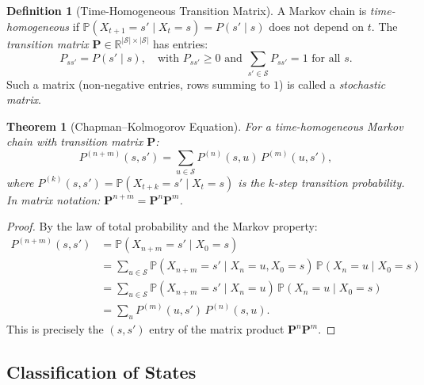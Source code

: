 \documentclass[11pt,a4paper]{article}
\theoremstyle{definition}
\newtheorem{definition}{Definition}[section]
\theoremstyle{plain}
\newtheorem{theorem}{Theorem}[section]
\theoremstyle{remark}
\newcommand{\R}{\mathbb{R}}
\newcommand{\Prob}{\mathbb{P}}
\begin{document}
\begin{definition}[Time-Homogeneous Transition Matrix]
\label{def:transition_matrix}
A Markov chain is \emph{time-homogeneous} if $\Prob(X_{t+1} = s' \mid X_t = s) = P(s' \mid s)$ does not depend on $t$. The \emph{transition matrix} $\mathbf{P} \in \R^{|\mathcal{S}| \times |\mathcal{S}|}$ has entries:
\begin{equation}
    P_{ss'} = P(s' \mid s), \quad \text{with } P_{ss'} \geq 0 \text{ and } \sum_{s' \in \mathcal{S}} P_{ss'} = 1 \text{ for all } s.
    \label{eq:transition_matrix}
\end{equation}
Such a matrix (non-negative entries, rows summing to $1$) is called a \emph{stochastic matrix}.
\end{definition}

\begin{theorem}[Chapman--Kolmogorov Equation]
\label{thm:chapman_kolmogorov}
For a time-homogeneous Markov chain with transition matrix $\mathbf{P}$:
\begin{equation}
    P^{(n+m)}(s, s') = \sum_{u \in \mathcal{S}} P^{(n)}(s, u)\, P^{(m)}(u, s'),
    \label{eq:ck}
\end{equation}
where $P^{(k)}(s, s') = \Prob(X_{t+k} = s' \mid X_t = s)$ is the $k$-step transition probability. In matrix notation: $\mathbf{P}^{n+m} = \mathbf{P}^n \mathbf{P}^m$.
\end{theorem}

\begin{proof}
By the law of total probability and the Markov property:
\begin{align}
    P^{(n+m)}(s, s') &= \Prob(X_{n+m} = s' \mid X_0 = s) \nonumber\\
    &= \sum_{u \in \mathcal{S}} \Prob(X_{n+m} = s' \mid X_n = u, X_0 = s)\, \Prob(X_n = u \mid X_0 = s) \nonumber\\
    &= \sum_{u \in \mathcal{S}} \Prob(X_{n+m} = s' \mid X_n = u)\, \Prob(X_n = u \mid X_0 = s) \tag{Markov property}\\
    &= \sum_u P^{(m)}(u, s')\, P^{(n)}(s, u). \nonumber
\end{align}
This is precisely the $(s, s')$ entry of the matrix product $\mathbf{P}^n \mathbf{P}^m$.
\end{proof}

\subsection{Classification of States}
\label{subsec:mc_classify}
\end{document}
